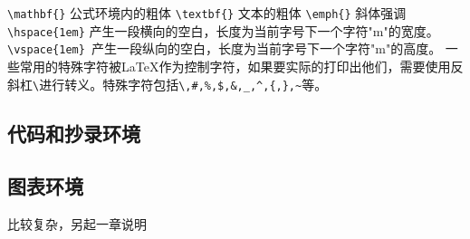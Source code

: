 \documentclass[../../main.tex]{subfiles}
\begin{document}
\verb|\mathbf{}| 公式环境内的粗体
\verb|\textbf{}| 文本的粗体
\verb|\emph{}| 斜体强调
\verb|\hspace{1em}| 产生一段横向的空白，长度为当前字号下一个字符"m"的宽度。
\verb|\vspace{1em} |产生一段纵向的空白，长度为当前字号下一个字符"m"的高度。
一些常用的特殊字符被LaTeX作为控制字符，如果要实际的打印出他们，需要使用反斜杠\verb|\|进行转义。特殊字符包括\verb|\,#,%,$,&,_,^,{,},~|等。


\subsection{代码和抄录环境}



\subsection{图表环境}
比较复杂，另起一章说明
\end{document}

